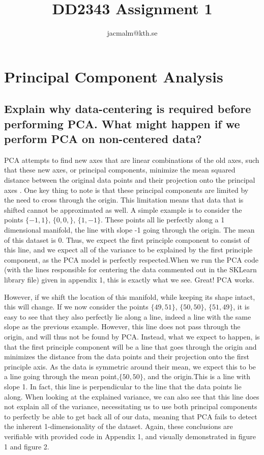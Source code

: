 \documentclass[11pt,a4paper,landscape]{article}
\author{jacmalm@kth.se}
\title{DD2343 Assignment 1}
\begin{document}
\maketitle
\newpage
\section{Principal Component Analysis}

\subsection{Explain why data-centering is required before performing PCA.  What might happen if we perform PCA on non-centered data?}
\label{mean-center}

PCA attempts to find new axes that are linear combinations of the old axes, such that these new axes, or principal components, minimize the mean squared distance between the original data points and their projection onto the principal axes \cite{pca_lecture_book}.  One key thing to note is that these principal components are limited by the need to cross through the origin. This limitation means that data that is shifted cannot be approximated as well. A simple example is to consider the points $\lbrace-1, 1\rbrace$, $\lbrace0,0,\rbrace$, $\lbrace1, -1\rbrace$. These points all lie perfectly along a 1 dimensional manifold, the line with slope -1 going through the origin. The mean of this dataset is 0. Thus, we expect the first principle component to consist of this line, and we expect all of the variance to be explained by the first principle component, as the PCA model is perfectly respected.When we run the PCA code (with the lines responsible for centering the data commented out in the SKLearn library file) given in appendix 1, this is exactly what we see. Great! PCA works.\newline

However, if we shift the location of this manifold, while keeping its shape intact, this will change. If we now consider the points $\lbrace49, 51\rbrace$, $\lbrace50,50\rbrace$, $\lbrace51, 49\rbrace$, it is easy to see that they also perfectly lie along a line, indeed a line with the same slope as the previous example. However, this line does not pass through the origin, and will thus not be found by PCA. Instead, what we expect to happen, is that the first principle component will be a line that goes through the origin and minimizes the distance from the data points and their projection onto the first principle axis. As the data is symmetric around their mean, we expect this to be a line going through the mean point,$\lbrace50,50\rbrace$, and the origin.This is a line with slope 1. In fact, this line is perpendicular to the line that the data points lie along. When looking at the explained variance, we can also see that this line does not explain all of the variance, necessitating us to use both principal components to perfectly be able to get back all of our data, meaning that PCA fails to detect the inherent 1-dimensionality of the dataset. Again, these conclusions are verifiable with provided code in Appendix 1, and visually demonstrated in figure 1 and figure 2.
\end{document}
